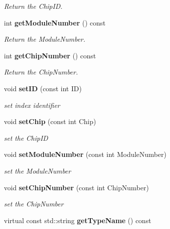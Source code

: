 \begin{DoxyCompactItemize}
\begin{DoxyCompactList}\small\item\em Return the Chip\-I\-D. \end{DoxyCompactList}\item 
int {\bf get\-Module\-Number} () const \label{classCALICE_1_1Ahc2HardwareConnection_af217512dbc7bf71d2c128a9935532294}

\begin{DoxyCompactList}\small\item\em Return the Module\-Number. \end{DoxyCompactList}\item 
int {\bf get\-Chip\-Number} () const \label{classCALICE_1_1Ahc2HardwareConnection_a64b7b4c23e8d862a1d0967186022785b}

\begin{DoxyCompactList}\small\item\em Return the Chip\-Number. \end{DoxyCompactList}\item 
void {\bf set\-I\-D} (const int I\-D)\label{classCALICE_1_1Ahc2HardwareConnection_a8cf88bd1e291534c8b73a37a707e9631}

\begin{DoxyCompactList}\small\item\em set index identifier \end{DoxyCompactList}\item 
void {\bf set\-Chip} (const int Chip)\label{classCALICE_1_1Ahc2HardwareConnection_a2e3f3b9483c6564db3451cdcb0caaf88}

\begin{DoxyCompactList}\small\item\em set the Chip\-I\-D \end{DoxyCompactList}\item 
void {\bf set\-Module\-Number} (const int Module\-Number)\label{classCALICE_1_1Ahc2HardwareConnection_a65292ca8879275abf37f19fb16fd198a}

\begin{DoxyCompactList}\small\item\em set the Module\-Number \end{DoxyCompactList}\item 
void {\bf set\-Chip\-Number} (const int Chip\-Number)\label{classCALICE_1_1Ahc2HardwareConnection_aeee207bd52c55f7499f8fc5cceed2720}

\begin{DoxyCompactList}\small\item\em set the Chip\-Number \end{DoxyCompactList}\item 
virtual const std\-::string {\bf get\-Type\-Name} () const \label{classCALICE_1_1Ahc2HardwareConnection_aca4aa2ddf56a2022029fbef9f28e17a2}


\end{DoxyCompactItemize}
